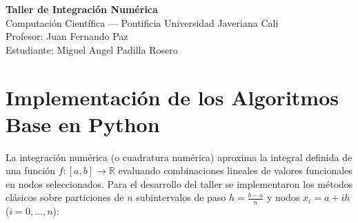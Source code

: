 \documentclass[11pt,a4paper]{article}
\begin{document}
\begin{center}
    {\LARGE\bfseries\color{pujblue} Taller de Integración Numérica}\\[0.3cm]
    {\large Computación Científica --- Pontificia Universidad Javeriana Cali}\\[0.1cm]
    {\normalsize Profesor: Juan Fernando Paz}\\[0.1cm]
    {\normalsize Estudiante: Miguel Angel Padilla Rosero}
\end{center}
\vspace{0.3cm}

\section{Implementación de los Algoritmos Base en Python}

La integración numérica (o cuadratura numérica) aproxima la integral definida de una función $f:[a,b]\to\mathbb{R}$ evaluando combinaciones lineales de valores funcionales en nodos seleccionados. Para el desarrollo del taller se implementaron los métodos clásicos sobre particiones de $n$ subintervalos de paso $h = \frac{b-a}{n}$ y nodos $x_i = a + i h$ ($i=0,\dots,n$):
\end{document}
